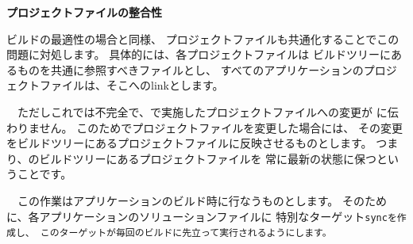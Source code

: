 \medskip
\noindent
\bf{プロジェクトファイルの整合性}
\begin{narrow}[20pt]
	ビルドの最適性の場合と同様、
	プロジェクトファイルも共通化することでこの問題に対処します。
	具体的には、各プロジェクトファイルは
	\SprLib ビルドツリーにあるものを共通に参照すべきファイルとし、
	すべてのアプリケーションのプロジェクトファイルは、そこへのlinkとします。

	　ただしこれでは不完全で、で実施したプロジェクトファイルへの変更が
	に伝わりません。
	このためでプロジェクトファイルを変更した場合には、
	その変更を\SprLib ビルドツリーにあるプロジェクトファイルに反映させるものとします。
	つまり、\SprLib のビルドツリーにあるプロジェクトファイルを
	常に最新の状態に保つということです。

	　この作業はアプリケーションのビルド時に行なうものとします。
	そのために、各アプリケーションのソリューションファイルに
	特別なターゲット\tt{sync}を作成し、
	このターゲットが毎回のビルドに先立って実行されるようにします。


\end{narrow}
